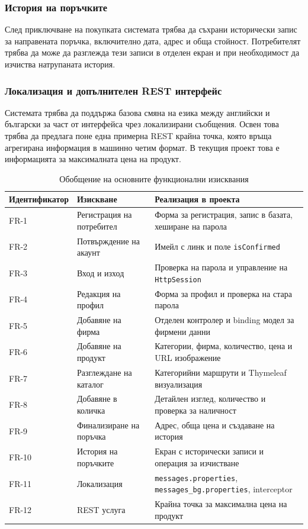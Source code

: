 \subsubsection{История на поръчките}

След приключване на покупката системата трябва да съхрани исторически запис за направената поръчка, включително дата, адрес и обща стойност. Потребителят трябва да може да разглежда тези записи в отделен екран и при необходимост да изчиства натрупаната история.

\subsubsection{Локализация и допълнителен REST интерфейс}

Системата трябва да поддържа базова смяна на езика между английски и български за част от интерфейса чрез локализирани съобщения. Освен това трябва да предлага поне една примерна REST крайна точка, която връща агрегирана информация в машинно четим формат. В текущия проект това е информацията за максималната цена на продукт.

\begin{table}[H]
    \centering
    \caption{Обобщение на основните функционални изисквания}
    \label{tab:functional-requirements}
    \begin{tabularx}{\textwidth}{L{3.0cm}YY}
        \toprule
        Идентификатор & Изискване & Реализация в проекта \\
        \midrule
        FR-1 & Регистрация на потребител & Форма за регистрация, запис в базата, хеширане на парола \\
        FR-2 & Потвърждение на акаунт & Имейл с линк и поле \texttt{isConfirmed} \\
        FR-3 & Вход и изход & Проверка на парола и управление на \texttt{HttpSession} \\
        FR-4 & Редакция на профил & Форма за профил и проверка на стара парола \\
        FR-5 & Добавяне на фирма & Отделен контролер и binding модел за фирмени данни \\
        FR-6 & Добавяне на продукт & Категории, фирма, количество, цена и URL изображение \\
        FR-7 & Разглеждане на каталог & Категорийни маршрути и Thymeleaf визуализация \\
        FR-8 & Добавяне в количка & Детайлен изглед, количество и проверка за наличност \\
        FR-9 & Финализиране на поръчка & Адрес, обща цена и създаване на история \\
        FR-10 & История на поръчките & Екран с исторически записи и операция за изчистване \\
        FR-11 & Локализация & \texttt{messages.properties}, \texttt{messages\_bg.properties}, interceptor \\
        FR-12 & REST услуга & Крайна точка за максимална цена на продукт \\
        \bottomrule
    \end{tabularx}
\end{table}

